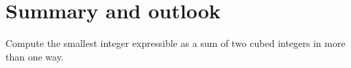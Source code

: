 
\chapter{Summary and outlook}

Compute the smallest integer expressible as a sum of two cubed integers
in more than one way.
